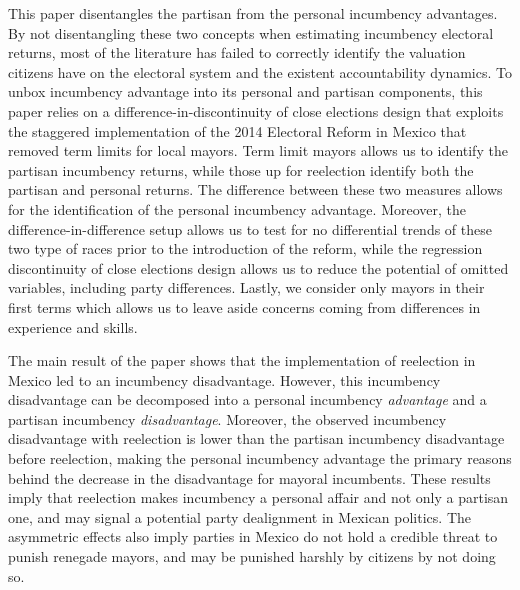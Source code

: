 \documentclass[12pt]{amsart}
\numberwithin{equation}{section}
\theoremstyle{definition}
\theoremstyle{definition}
\theoremstyle{definition}
\begin{document}
This paper disentangles the partisan from the personal incumbency advantages. By not disentangling these two concepts when estimating incumbency electoral returns, most of the literature has failed to correctly identify the valuation citizens have on the electoral system and the existent accountability dynamics. To unbox incumbency advantage into its personal and partisan components, this paper relies on a difference-in-discontinuity of close elections design that exploits the staggered implementation of the 2014 Electoral Reform in Mexico that removed term limits for local mayors. Term limit mayors allows us to identify the partisan incumbency returns, while those up for reelection identify both the partisan and personal returns. The difference between these two measures allows for the identification of the personal incumbency advantage. Moreover, the difference-in-difference setup allows us to test for no differential trends of these two type of races prior to the introduction of the reform, while the regression discontinuity of close elections design allows us to reduce the potential of omitted variables, including party differences. Lastly, we consider only mayors in their first terms which allows us to leave aside concerns coming from differences in experience and skills. 

The main result of the paper shows that the implementation of reelection in Mexico led to an incumbency disadvantage. However, this incumbency disadvantage can be decomposed into a personal incumbency \emph{advantage} and a partisan incumbency  \emph{disadvantage}. Moreover, the observed incumbency disadvantage with reelection is lower than the partisan incumbency disadvantage before reelection, making the personal incumbency advantage the primary reasons behind the decrease in the disadvantage for mayoral incumbents. These results imply that reelection makes incumbency a personal affair and not only a partisan one, and may signal a potential party dealignment in Mexican politics. The asymmetric effects also imply parties in Mexico do not hold a credible threat to punish renegade mayors, and may be punished harshly by citizens by not doing so. 
\end{document}
